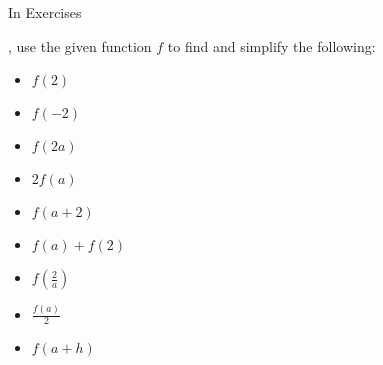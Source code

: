 {\noindent In Exercises}
{, use the given function $f$ to find and simplify the following:

\begin{multicols}{2}
\begin{itemize}
\item  $f(2)$
\item  $f(-2)$
\item  $f(2a)$
\item  $2 f(a)$
\item $f(a+2)$
\item $f(a) + f(2)$
\item  $f \left( \frac{2}{a} \right)$
\item $\frac{f(a)}{2}$
\item  $f(a + h)$
\end{itemize}
\end{multicols}
}
